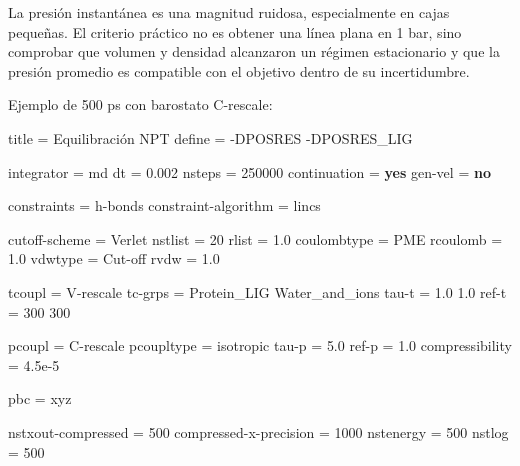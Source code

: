 \documentclass[
  spanish,
  11pt,
  a4paper]{article}
\newenvironment{Shaded}{\begin{snugshade}}{\end{snugshade}}
\newcommand{\DataTypeTok}[1]{\textcolor[rgb]{0.13,0.29,0.53}{#1}}
\newcommand{\DecValTok}[1]{\textcolor[rgb]{0.00,0.00,0.81}{#1}}
\newcommand{\FloatTok}[1]{\textcolor[rgb]{0.00,0.00,0.81}{#1}}
\newcommand{\KeywordTok}[1]{\textcolor[rgb]{0.13,0.29,0.53}{\textbf{#1}}}
\newcommand{\OtherTok}[1]{\textcolor[rgb]{0.56,0.35,0.01}{#1}}
\newcommand{\StringTok}[1]{\textcolor[rgb]{0.31,0.60,0.02}{#1}}
\begin{document}
La presión instantánea es una magnitud ruidosa, especialmente en cajas
pequeñas. El criterio práctico no es obtener una línea plana en 1 bar,
sino comprobar que volumen y densidad alcanzaron un régimen estacionario
y que la presión promedio es compatible con el objetivo dentro de su
incertidumbre.

Ejemplo de 500 ps con barostato C-rescale:

\begin{Shaded}
\begin{Highlighting}[]
\DataTypeTok{title                    }\OtherTok{=}\StringTok{ Equilibración NPT}
\DataTypeTok{define                   }\OtherTok{=}\StringTok{ {-}DPOSRES {-}DPOSRES\_LIG}

\DataTypeTok{integrator               }\OtherTok{=}\StringTok{ md}
\DataTypeTok{dt                       }\OtherTok{=}\StringTok{ }\FloatTok{0.002}
\DataTypeTok{nsteps                   }\OtherTok{=}\StringTok{ }\DecValTok{250000}
\DataTypeTok{continuation             }\OtherTok{=}\StringTok{ }\KeywordTok{yes}
\DataTypeTok{gen{-}vel                  }\OtherTok{=}\StringTok{ }\KeywordTok{no}

\DataTypeTok{constraints              }\OtherTok{=}\StringTok{ h{-}bonds}
\DataTypeTok{constraint{-}algorithm     }\OtherTok{=}\StringTok{ lincs}

\DataTypeTok{cutoff{-}scheme            }\OtherTok{=}\StringTok{ Verlet}
\DataTypeTok{nstlist                  }\OtherTok{=}\StringTok{ }\DecValTok{20}
\DataTypeTok{rlist                    }\OtherTok{=}\StringTok{ }\FloatTok{1.0}
\DataTypeTok{coulombtype              }\OtherTok{=}\StringTok{ PME}
\DataTypeTok{rcoulomb                 }\OtherTok{=}\StringTok{ }\FloatTok{1.0}
\DataTypeTok{vdwtype                  }\OtherTok{=}\StringTok{ Cut{-}off}
\DataTypeTok{rvdw                     }\OtherTok{=}\StringTok{ }\FloatTok{1.0}

\DataTypeTok{tcoupl                   }\OtherTok{=}\StringTok{ V{-}rescale}
\DataTypeTok{tc{-}grps                  }\OtherTok{=}\StringTok{ Protein\_LIG Water\_and\_ions}
\DataTypeTok{tau{-}t                    }\OtherTok{=}\StringTok{ 1.0 1.0}
\DataTypeTok{ref{-}t                    }\OtherTok{=}\StringTok{ 300 300}

\DataTypeTok{pcoupl                   }\OtherTok{=}\StringTok{ C{-}rescale}
\DataTypeTok{pcoupltype               }\OtherTok{=}\StringTok{ isotropic}
\DataTypeTok{tau{-}p                    }\OtherTok{=}\StringTok{ }\FloatTok{5.0}
\DataTypeTok{ref{-}p                    }\OtherTok{=}\StringTok{ }\FloatTok{1.0}
\DataTypeTok{compressibility          }\OtherTok{=}\StringTok{ 4.5e{-}5}

\DataTypeTok{pbc                      }\OtherTok{=}\StringTok{ xyz}

\DataTypeTok{nstxout{-}compressed       }\OtherTok{=}\StringTok{ }\DecValTok{500}
\DataTypeTok{compressed{-}x{-}precision   }\OtherTok{=}\StringTok{ }\DecValTok{1000}
\DataTypeTok{nstenergy                }\OtherTok{=}\StringTok{ }\DecValTok{500}
\DataTypeTok{nstlog                   }\OtherTok{=}\StringTok{ }\DecValTok{500}
\end{Highlighting}
\end{Shaded}
\end{document}
